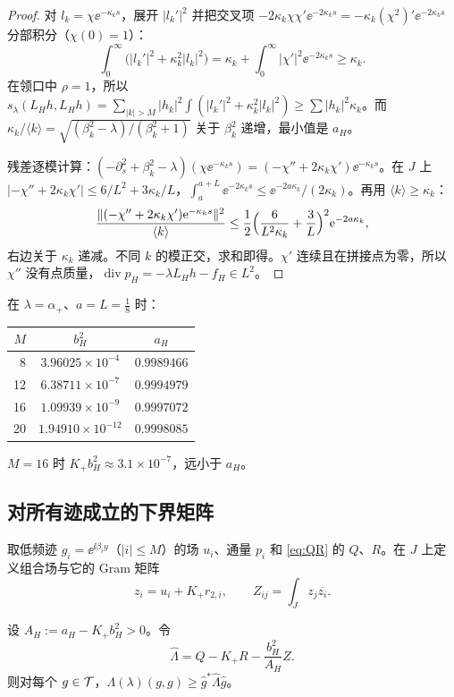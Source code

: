 \documentclass[11pt,a4paper,fontset=fandol]{ctexart}
\begin{document}
\begin{proof}
对 $l_k=\chi\ee^{-\kappa_ks}$，展开 $|l_k'|^2$ 并把交叉项 $-2\kappa_k\chi\chi'\ee^{-2\kappa_ks}=-\kappa_k(\chi^2)'\ee^{-2\kappa_ks}$ 分部积分（$\chi(0)=1$）：
\[
\int_0^\infty\bigl(|l_k'|^2+\kappa_k^2|l_k|^2\bigr)=\kappa_k+\int_0^\infty|\chi'|^2\ee^{-2\kappa_ks}\ge\kappa_k .
\]
在领口中 $\rho=1$，所以 $s_\lambda(L_Hh,L_Hh)=\sum_{|k|>M}|h_k|^2\int(|l_k'|^2+\kappa_k^2|l_k|^2)\ge\sum|h_k|^2\kappa_k$。而 $\kappa_k/\langle k\rangle=\sqrt{(\beta_k^2-\lambda)/(\beta_k^2+1)}$ 关于 $\beta_k^2$ 递增，最小值是 $a_H$。

残差逐模计算：$(-\partial_s^2+\beta_k^2-\lambda)(\chi\ee^{-\kappa_ks})=(-\chi''+2\kappa_k\chi')\ee^{-\kappa_ks}$。在 $J$ 上 $|{-\chi''}+2\kappa_k\chi'|\le6/L^2+3\kappa_k/L$，$\int_a^{a+L}\ee^{-2\kappa_ks}\le\ee^{-2a\kappa_k}/(2\kappa_k)$。再用 $\langle k\rangle\ge\kappa_k$：
\[
\frac{\|(-\chi''+2\kappa_k\chi')\mathrm{e}^{-\kappa_ks}\|^2}{\langle k\rangle}\le\frac12\Bigl(\frac6{L^2\kappa_k}+\frac3L\Bigr)^2\mathrm{e}^{-2a\kappa_k},
\]
右边关于 $\kappa_k$ 递减。不同 $k$ 的模正交，求和即得。$\chi'$ 连续且在拼接点为零，所以 $\chi''$ 没有点质量，$\operatorname{div}p_H=-\lambda L_Hh-f_H\in L^2$。
\end{proof}

在 $\lambda=\alpha_+$、$a=L=\tfrac18$ 时：
\begin{center}
\small
\begin{tabular}{rcc}
\toprule
$M$ & $b_H^2$ & $a_H$ \\
\midrule
8 & $3.96025\times10^{-4}$ & $0.9989466$ \\
12 & $6.38711\times10^{-7}$ & $0.9994979$ \\
16 & $1.09939\times10^{-9}$ & $0.9997072$ \\
20 & $1.94910\times10^{-12}$ & $0.9998085$ \\
\bottomrule
\end{tabular}
\end{center}
$M=16$ 时 $K_+b_H^2\approx3.1\times10^{-7}$，远小于 $a_H$。

\subsection{对所有迹成立的下界矩阵}

取低频迹 $g_i=\ee^{\ii\beta_iy}$（$|i|\le M$）的场 $u_i$、通量 $p_i$ 和 \eqref{eq:QR} 的 $Q$、$R$。在 $J$ 上定义组合场与它的 Gram 矩阵
\[
z_i=u_i+K_+r_{2,i},\qquad Z_{ij}=\int_Jz_j\overline{z_i}.
\]

\begin{theorem}[全迹下界]
\label{thm:dtn-lower}
设 $A_H:=a_H-K_+b_H^2>0$。令
\begin{equation}
\label{eq:Lambda-hat}
\hat\Lambda=Q-K_+R-\frac{b_H^2}{A_H}Z .
\end{equation}
则对每个 $g\in\mathcal T$，$\Lambda(\lambda)(g,g)\ge\hat g^*\hat\Lambda\hat g$。
\end{theorem}
\end{document}
